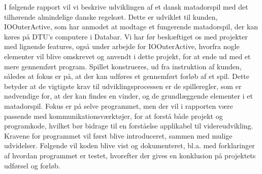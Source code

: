 \documentclass[class=article, crop=false]{standalone}
\begin{document}
   I følgende rapport vil vi beskrive udviklingen af et dansk matadorspil med det tilhørende almindelige danske regelsæt. Dette er udviklet til kunden, IOOuterActive, som har anmodet at modtage et fungerende matadorspil, der kan køres på DTU’s computere i Databar. Vi har før beskæftiget os med projekter med lignende features, også under arbejde for IOOuterActive, hvorfra nogle elementer vil blive omskrevet og anvendt i dette projekt, for at ende ud med et mere gennemført program. Spillet konstrueres, ud fra instruktion af kunden, således at fokus er på, at der kan udføres et gennemført forløb af et spil. Dette betyder at de vigtigste krav til udviklingsprocessen er de spilleregler, som er nødvendige for, at der kan findes en vinder, og de grundlæggende elementer i et matadorspil. Fokus er på selve programmet, men der vil i rapporten være passende med kommunikationsværktøjer, for at forstå både projekt og programkode, hvilket bør bidrage til en forståelse applikabel til videreudvikling. Kravene for programmet vil først blive introduceret, sammen med mulige udvidelser. Følgende vil koden blive vist og dokumenteret, bl.a. med forklaringer af hvordan programmet er testet, hvorefter der gives en konklusion på projektets udførsel og forløb.
\end{document}
